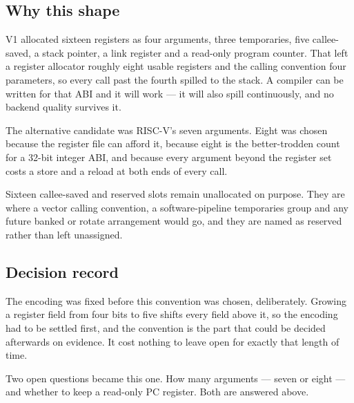 \documentclass[11pt,a4paper]{article}
\begin{document}
\subsection{Why this shape}

V1 allocated sixteen registers as four arguments, three temporaries, five
callee-saved, a stack pointer, a link register and a read-only program
counter. That left a register allocator roughly eight usable registers and the
calling convention four parameters, so every call past the fourth spilled to
the stack. A compiler can be written for that ABI and it will work --- it will
also spill continuously, and no backend quality survives it.

The alternative candidate was RISC-V's seven arguments. Eight was chosen
because the register file can afford it, because eight is the better-trodden
count for a 32-bit integer ABI, and because every argument beyond the register
set costs a store and a reload at both ends of every call.

Sixteen callee-saved and reserved slots remain unallocated on purpose. They are
where a vector calling convention, a software-pipeline temporaries group and
any future banked or rotate arrangement would go, and they are named as
reserved rather than left unassigned.

\subsection{Decision record}

The encoding was fixed before this convention was chosen, deliberately. Growing
a register field from four bits to five shifts every field above it, so the
encoding had to be settled first, and the convention is the part that could be
decided afterwards on evidence. It cost nothing to leave open for exactly that
length of time.

Two open questions became this one. How many arguments --- seven or eight ---
and whether to keep a read-only PC register. Both are answered above.
\end{document}
